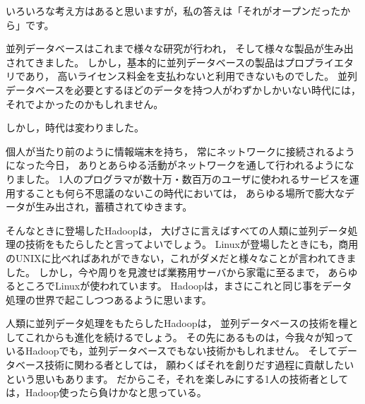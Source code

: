 いろいろな考え方はあると思いますが，私の答えは「それがオープンだったから」です。

並列データベースはこれまで様々な研究が行われ，
そして様々な製品が生み出されてきました。
しかし，基本的に並列データベースの製品はプロプライエタリであり，
高いライセンス料金を支払わないと利用できないものでした。
並列データベースを必要とするほどのデータを持つ人がわずかしかいない時代には，
それでよかったのかもしれません。

しかし，時代は変わりました。

個人が当たり前のように情報端末を持ち，
常にネットワークに接続されるようになった今日，
ありとあらゆる活動がネットワークを通して行われるようになりました。
1人のプログラマが数十万・数百万のユーザに使われるサービスを運用することも何ら不思議のないこの時代においては，
あらゆる場所で膨大なデータが生み出され，蓄積されてゆきます。

そんなときに登場したHadoopは，
大げさに言えばすべての人類に並列データ処理の技術をもたらしたと言ってよいでしょう。
Linuxが登場したときにも，商用のUNIXに比べればあれができない，これがダメだと様々なことが言われてきました。
しかし，今や周りを見渡せば業務用サーバから家電に至るまで，
あらゆるところでLinuxが使われています。
Hadoopは，まさにこれと同じ事をデータ処理の世界で起こしつつあるように思います。

人類に並列データ処理をもたらしたHadoopは，
並列データベースの技術を糧としてこれからも進化を続けるでしょう。
その先にあるものは，今我々が知っているHadoopでも，並列データベースでもない技術かもしれません。
そしてデータベース技術に関わる者としては，
願わくばそれを創りだす過程に貢献したいという思いもあります。
だからこそ，それを楽しみにする1人の技術者としては，Hadoop使ったら負けかなと思っている。
